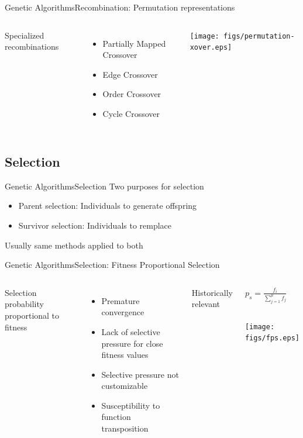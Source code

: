 \documentclass[10pt,compress]{beamer} %
\begin{document}
\begin{frame}{Genetic Algorithms}{Recombination: Permutation representations}
    \begin{columns}
		Specialized recombinations
		\begin{itemize}
		\item Partially Mapped Crossover
		\item Edge Crossover
		\item Order Crossover
		\item Cycle Crossover
		\end{itemize}

		\texttt{[image: figs/permutation-xover.eps]}
	\end{columns}
\end{frame}

\subsection{Selection}
\begin{frame}{Genetic Algorithms}{Selection}
	Two purposes for selection
	\begin{itemize}
		\item Parent selection: Individuals to generate offspring
		\item Survivor selection: Individuals to remplace
  	\end{itemize}
	Usually same methods applied to both
\end{frame}

\begin{frame}{Genetic Algorithms}{Selection: Fitness Proportional Selection}
    \begin{columns}
	Selection probability proportional to fitness 
	\begin{itemize}
		\item Premature convergence
		\item Lack of selective pressure for close fitness values
		\item Selective pressure not customizable
		\item Susceptibility to function transposition
  	\end{itemize}
	Historically relevant
	\begin{center}
    \begin{columns}
	\begin{block}{}
	$p_s = \frac{f_i}{\sum_{j=1}^\mu f_j}$
	\end{block}
	\end{columns}
	\bigskip
	\texttt{[image: figs/fps.eps]}
	\end{center}
	\end{columns}
\end{frame}
\end{document}
